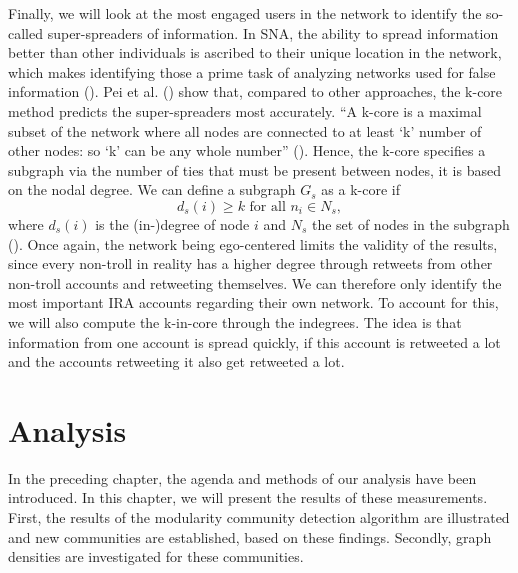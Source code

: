 \documentclass[12pt, titlepage=true, toc=bib]{scrartcl}
\begin{document}
Finally, we will look at the most engaged users in the network to identify the so-called super-spreaders of information. In SNA, the ability to spread information better than other individuals is ascribed to their unique location in the network, which makes identifying those a prime task of analyzing networks used for false information (\cite[1]{pei_searching_2015}). Pei et al. (\cite*{pei_searching_2015}) show that, compared to other approaches, the k-core method predicts the super-spreaders most accurately. \enquote{A k-core is a maximal subset of the network where all nodes are connected to at least \enquote{k} number of other nodes: so \enquote{k} can be any whole number} (\cite[983]{golovchenko_state_2018}). Hence, the k-core specifies a subgraph via the number of ties that must be present between nodes, it is based on the nodal degree. We can define a subgraph \( G_{s} \) as a k-core if \[ d_{s}(i) \geq k \text{ for all } n_{i} \in N_{s} ,\] where \( d_{s}(i) \) is the (in-)degree of node \( i \) and \( N_{s} \) the set of nodes in the subgraph (\cite[266]{wasserman_social_1994}). Once again, the network being ego-centered limits the validity of the results, since every non-troll in reality has a higher degree through retweets from other non-troll accounts and retweeting themselves. We can therefore only identify the most important IRA accounts regarding their own network. To account for this, we will also compute the k-in-core through the indegrees. The idea is that information from one account is spread quickly, if this account is retweeted a lot and the accounts retweeting it also get retweeted a lot.

\section{Analysis}

In the preceding chapter, the agenda and methods of our analysis have been introduced. In this chapter, we will present the results of these measurements. First, the results of the modularity community detection algorithm are illustrated and new communities are established, based on these findings. Secondly, graph densities are investigated for these communities.
\end{document}
